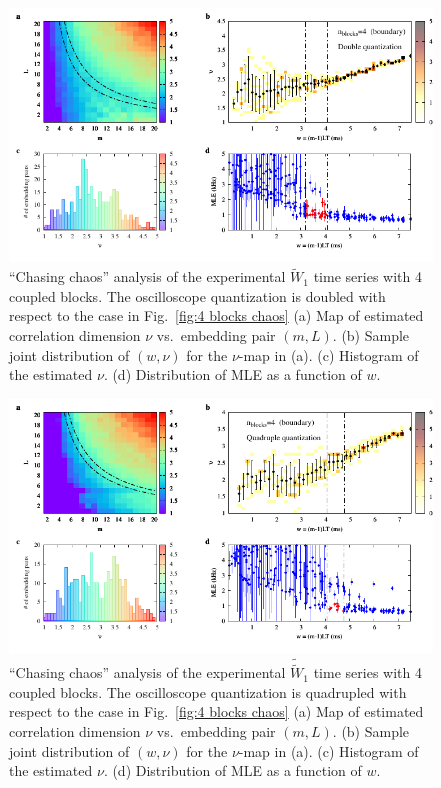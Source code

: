 \begin{appendices}
\begin{figure}[!htbp]
    \centering
    \includegraphics[width=\linewidth]{../blocks/4_blocks/2e5_points_new_divided/plots/chaos_low.pdf}
    \caption{``Chasing chaos'' analysis of the experimental $\tilde{W}_1$ time series with 4 coupled blocks.
    The oscilloscope quantization is doubled with respect to the case in Fig.~\ref{fig:4 blocks chaos}
    (a) Map of estimated correlation dimension $\nu$ vs.\ embedding pair $(m, L)$.
    (b) Sample joint distribution of $(w,\nu)$ for the $\nu$-map in (a).
    (c) Histogram of the estimated $\nu$. (d) Distribution of MLE as a function of $w$.
    }%
    \label{fig:4 blocks chaos double quant}
\end{figure}

\begin{figure}[!htbp]
    \centering
    \includegraphics[width=\linewidth]{../blocks/4_blocks/2e5_points_new_divided_4/plots/chaos_low.pdf}
    \caption{``Chasing chaos'' analysis of the experimental $\tilde{\tilde{W}}_1$ time series with 4 coupled blocks.
    The oscilloscope quantization is quadrupled with respect to the case in Fig.~\ref{fig:4 blocks chaos}
    (a) Map of estimated correlation dimension $\nu$ vs.\ embedding pair $(m, L)$.
    (b) Sample joint distribution of $(w,\nu)$ for the $\nu$-map in (a).
    (c) Histogram of the estimated $\nu$. (d) Distribution of MLE as a function of $w$.
    }%
    \label{fig:4 blocks chaos quadruple quant}
\end{figure}



\end{appendices}
